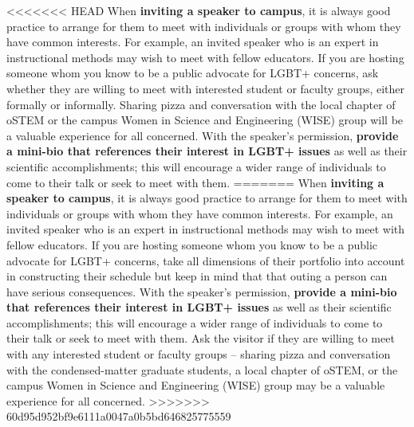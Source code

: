 <<<<<<< HEAD
When \textbf{inviting a speaker to campus}, it is always good practice to arrange for them to meet with individuals or groups with whom they have common interests. For example, an invited speaker who is an expert in instructional methods may wish to meet with fellow educators. If you are hosting someone whom you know to be a public advocate for LGBT+ concerns, ask whether they are willing to meet with interested student or faculty groups, either formally or informally.  Sharing pizza and conversation with the local chapter of oSTEM or the campus Women in Science and Engineering (WISE) group will be a valuable experience for all concerned.  With the speaker's permission, \textbf{provide a mini-bio that references their interest in LGBT+ issues} as well as their scientific accomplishments; this will encourage a wider range of individuals to come to their talk or seek to meet with them.  
=======
When \textbf{inviting a speaker to campus}, it is always good practice to arrange for them to meet with individuals or groups with whom they have common interests. For example, an invited speaker who is an expert in instructional methods may wish to meet with fellow educators. If you are hosting someone whom you know to be a public advocate for LGBT+ concerns, take all dimensions of their portfolio into account in constructing their schedule but keep in mind that that outing a person can have serious consequences. With the speaker's permission, \textbf{provide a mini-bio that references their interest in LGBT+ issues} as well as their scientific accomplishments; this will encourage a wider range of individuals to come to their talk or seek to meet with them. Ask the visitor if they are willing to meet with any interested student or faculty groups -- sharing pizza and conversation with the condensed-matter graduate students, a local chapter of oSTEM, or the campus Women in Science and Engineering (WISE) group may be a valuable experience for all concerned.
>>>>>>> 60d95d952bf9e6111a0047a0b5bd646825775559

